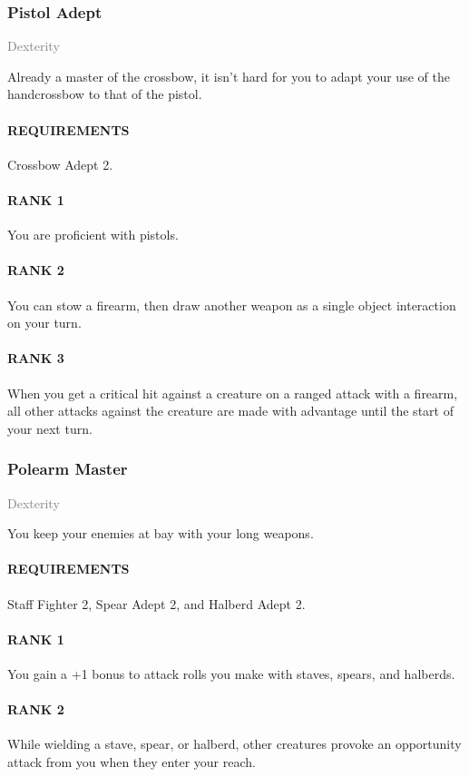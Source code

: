 \subsubsection{Pistol Adept} \label{feat::pistoladept}
\small{\textcolor{gray}{Dexterity}}

\normalsize
Already a master of the crossbow, it isn't hard for you to adapt your use of the handcrossbow to that of the pistol.
\paragraph{REQUIREMENTS} Crossbow Adept 2.
\paragraph{RANK 1} You are proficient with pistols.
\paragraph{RANK 2} You can stow a firearm, then draw another weapon as a single object interaction on your turn.
\paragraph{RANK 3} When you get a critical hit against a creature on a ranged attack with a firearm, all other attacks against the creature are made with advantage until the start of your next turn.

\subsubsection{Polearm Master} \label{feat::polerarmmaster} %
\small{\textcolor{gray}{Dexterity}}

\normalsize
You keep your enemies at bay with your long weapons.
\paragraph{REQUIREMENTS} Staff Fighter 2, Spear Adept 2, and Halberd Adept 2.
\paragraph{RANK 1} You gain a +1 bonus to attack rolls you make with staves, spears, and halberds.
\paragraph{RANK 2} While wielding a stave, spear, or halberd, other creatures provoke an opportunity attack from you when they enter your reach.
